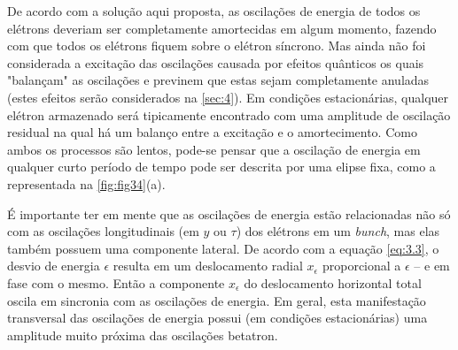 De acordo com a solução aqui proposta, as oscilações de energia de todos os elétrons deveriam ser completamente amortecidas em algum momento, fazendo com que todos os elétrons fiquem sobre o elétron síncrono. Mas ainda não foi considerada a excitação das oscilações causada por efeitos quânticos os quais "balançam" as oscilações e previnem que estas sejam completamente anuladas (estes efeitos serão considerados na \autoref{sec:4}). Em condições estacionárias, qualquer elétron armazenado será tipicamente encontrado com uma amplitude de oscilação residual na qual há um balanço entre a excitação e o amortecimento. Como ambos os processos são lentos, pode-se pensar que a oscilação de energia em qualquer curto período de tempo pode ser descrita por uma elipse fixa, como a representada na \autoref{fig:fig34}(a).

É importante ter em mente que as oscilações de energia estão relacionadas não só com as oscilações longitudinais (em $y$ ou $\tau$) dos elétrons em um \textit{bunch}, mas elas também possuem uma componente lateral. De acordo com a equação \eqref{eq:3.3}, o desvio de energia $\epsilon$ resulta em um deslocamento radial $x_\epsilon$ proporcional a $\epsilon$ -- e em fase com o mesmo. Então a componente $x_\epsilon$ do deslocamento horizontal total oscila em sincronia com as oscilações de energia. Em geral, esta manifestação transversal das oscilações de energia possui (em condições estacionárias) uma amplitude muito próxima das oscilações betatron.